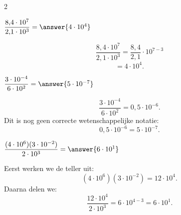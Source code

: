 \documentclass{ximera}
\begin{document}
\begin{oefening}{\oefB\ESS}
\begin{multicols}{2}
            
            \begin{question}
            $\dfrac{8{,}4\cdot10^7}
            {2{,}1\cdot10^3}
            =\answer{4\cdot10^4}$
            
            \begin{oplossing}
            \[
            \dfrac{8{,}4\cdot10^7}
            {2{,}1\cdot10^3}
            =\dfrac{8{,}4}{2{,}1}\cdot10^{7-3}
            \]
            \[
            =4\cdot10^4.
            \]
            \end{oplossing}
            \end{question}
            
            
            \begin{question}
            $\dfrac{3\cdot10^{-4}}
            {6\cdot10^2}
            =\answer{5\cdot10^{-7}}$
            
            \begin{oplossing}
            \[
            \dfrac{3\cdot10^{-4}}
            {6\cdot10^2}
            =0{,}5\cdot10^{-6}.
            \]
            Dit is nog geen correcte wetenschappelijke notatie:
            \[
            0{,}5\cdot10^{-6}
            =5\cdot10^{-7}.
            \]
            \end{oplossing}
            \end{question}
            
            
            \begin{question}
            $\dfrac{(4\cdot10^6)(3\cdot10^{-2})}
            {2\cdot10^3}
            =\answer{6\cdot10^1}$
            
            \begin{oplossing}
            Eerst werken we de teller uit:
            \[
            (4\cdot10^6)(3\cdot10^{-2})
            =12\cdot10^4.
            \]
            Daarna delen we:
            \[
            \dfrac{12\cdot10^4}{2\cdot10^3}
            =6\cdot10^{4-3}
            =6\cdot10^1.
            \]
            \end{oplossing}
            \end{question}
            
            \end{multicols}
            
            \end{oefening}
\end{document}
